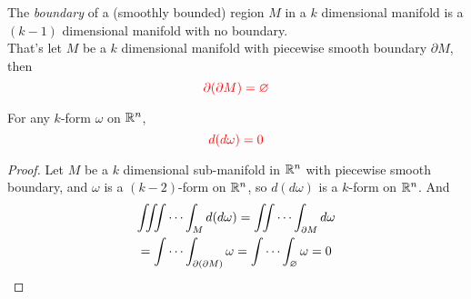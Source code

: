\documentclass[11pt]{article}
\begin{document}
			\begin{theorem}
				The \emph{boundary} of a (smoothly bounded) region $M$ in a $k$ dimensional manifold is a $(k-1)$ dimensional manifold with no boundary. \\
				That's let $M$ be a $k$ dimensional manifold with piecewise smooth boundary $\partial M$, then
				\begin{equation}
					\textcolor{red}{\partial (\partial M) = \varnothing}
				\end{equation}
			\end{theorem}
			
			\begin{theorem}
				For any $k$-form $\omega$ on $\mathbb{R}^n$,
				\begin{equation}
					\textcolor{red}{d(d\omega) = 0}
				\end{equation}
				
				\begin{proof}
					Let $M$ be a $k$ dimensional sub-manifold in $\mathbb{R}^n$ with piecewise smooth boundary, and $\omega$ is a $(k-2)$-form on $\mathbb{R}^n$, so $d(d\omega)$ is a $k$-form on $\mathbb{R}^n$. And
					\begin{gather}
						\iiint \cdots \int_M d(d \omega) 
						= \iint \cdots \int_{\partial M} d\omega \\
						= \idotsint_{\partial(\partial M)} \omega = \idotsint_{\varnothing} \omega = 0
					\end{gather}
				\end{proof}
			\end{theorem}
%			
\end{document}
